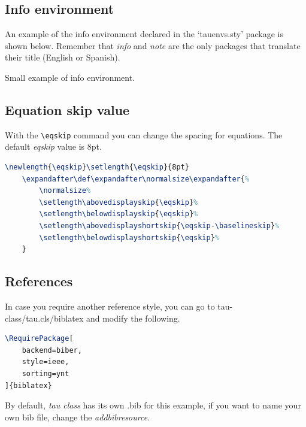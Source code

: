 \documentclass[9pt,a4paper,twocolumn,twoside]{tau-class/tau}
\begin{document}
    \subsection{Info environment}

        An example of the info environment declared in the ‘tauenvs.sty’ package is shown below. Remember that \textit{info} and \textit{note} are the only packages that translate their title (English or Spanish).
		
	\begin{info}
		Small example of info environment.
	\end{info}

    \subsection{Equation skip value}

        With the \verb|\eqskip| command you can change the spacing for equations. The default \textit{eqskip} value is 8pt.

\begin{lstlisting}[language=TeX, caption=Equation skip code.]
\newlength{\eqskip}\setlength{\eqskip}{8pt}
	\expandafter\def\expandafter\normalsize\expandafter{%
		\normalsize%
		\setlength\abovedisplayskip{\eqskip}%
		\setlength\belowdisplayskip{\eqskip}%
		\setlength\abovedisplayshortskip{\eqskip-\baselineskip}%
		\setlength\belowdisplayshortskip{\eqskip}%
	}
\end{lstlisting}
		
    \subsection{References}
		
        In case you require another reference style, you can go to tau-class/tau.cls/biblatex and modify the following.
		
\begin{lstlisting}[language=TeX, caption=References style.]
\RequirePackage[
	backend=biber,
	style=ieee,
	sorting=ynt
]{biblatex}
\end{lstlisting}

        By default, \textit{tau class} has its own .bib for this example, if you want to name your own bib file, change the \textit{addbibresource}.
		
\begin{lstlisting}[language=TeX]

\end{lstlisting}
\end{document}
